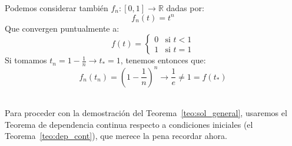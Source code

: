 \begin{ejemplo}
    Podemos considerar también $f_n:[0,1]\to \mathbb{R}$ dadas por:
    \begin{equation*}
        f_n(t) = t^n
    \end{equation*}
    Que convergen puntualmente a:
    \begin{equation*}
        f(t) = \left\{\begin{array}{ll}
            0 & \text{si\ } t<1 \\
            1 & \text{si\ } t=1
        \end{array}\right. 
    \end{equation*}
    Si tomamos $t_n = 1-\frac{1}{n}\to t_\ast = 1$, tenemos entonces que:
    \begin{equation*}
        f_n(t_n) = {\left(1-\frac{1}{n}\right)}^{n} \to \frac{1}{e} \neq 1 = f(t_\ast)
    \end{equation*}
\end{ejemplo}~\\

\noindent
Para proceder con la demostración del Teorema~\ref{teo:sol_general}, usaremos el Teorema de dependencia continua respecto a condiciones iniciales (el Teorema~\ref{teo:dep_cont}), que merece la pena recordar ahora.

